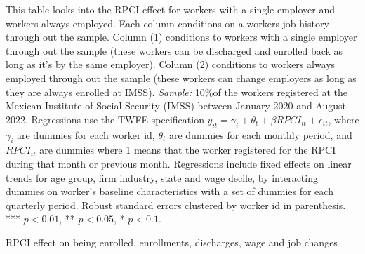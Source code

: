 \documentclass[oneside,11pt]{article}
\begin{document}
\scriptsize{
\noindent This table looks into the RPCI effect for workers with a single employer and workers always employed. Each column conditions on a workers job history through out the sample. Column (1) conditions to workers with a single employer through out the sample (these workers can be discharged and enrolled back as long as it's by the same employer). Column (2) conditions to workers always employed through out the sample (these workers can change employers as long as they are always enrolled at IMSS). \textit{Sample:} 10\%of the workers registered at the Mexican Institute of Social Security (IMSS) between January 2020 and August 2022. Regressions use the TWFE specification $y_{it} = \gamma_{i} + \theta_{t}+ \beta RPCI_{it} +\epsilon_{it}$, where $\gamma_{i}$ are dummies for each worker id, $\theta_{t}$ are dummies for each monthly period, and $RPCI_{it}$ are dummies where 1 means that the worker registered for the RPCI during that month or previous month. Regressions include fixed effects on linear trends for age group, firm industry, state and wage decile, by interacting dummies on worker's baseline characteristics with a set of dummies for each quarterly period. Robust standard errors clustered by worker id in parenthesis. *** $p<0.01$, ** $p<0.05$, * $p<0.1$.
}


\clearpage

\begin{table}[H]
    \caption{RPCI effect on being enrolled, enrollments, discharges, wage and job changes}
    \label{twfe_job}
    \begin{center}
    \scriptsize{}
    \end{center}
\end{table}
\end{document}
